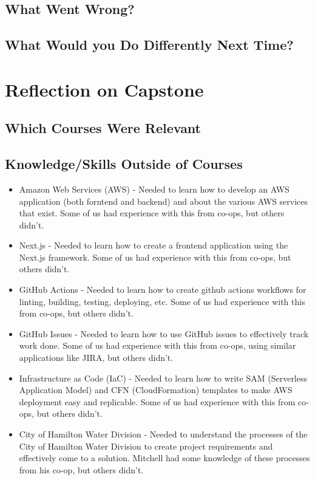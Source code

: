 \documentclass{article}
\begin{document}
\subsection{What Went Wrong?}


\subsection{What Would you Do Differently Next Time?}


\section{Reflection on Capstone}


\subsection{Which Courses Were Relevant}


\subsection{Knowledge/Skills Outside of Courses}
\begin{itemize}
  \item Amazon Web Services (AWS) - Needed to learn how to develop an AWS
    application (both forntend and backend) and about the various AWS
    services that exist. Some of us had experience with this from
    co-ops, but others didn't.
  \item Next.js - Needed to learn how to create a frontend application using
    the Next.js framework. Some of us had experience with this from
    co-ops, but others didn't.
  \item GitHub Actions - Needed to learn how to create github actions
    workflows for linting, building, testing, deploying, etc. Some of
    us had experience with this from co-ops, but others didn't.
  \item GitHub Issues - Needed to learn how to use GitHub issues to
    effectively track work done. Some of us had experience with this
    from co-ops, using similar applications like JIRA, but others didn't.
  \item Infrastructure as Code (IaC) - Needed to learn how to write SAM
    (Serverless Application Model) and CFN (CloudFormation) templates to
    make AWS deployment easy and replicable. Some of us had
    experience with this from co-ops, but others didn't.
  \item City of Hamilton Water Division - Needed to understand the
    processes of the City of Hamilton Water Division to create
    project requirements and effectively come to a solution. Mitchell
    had some knowledge of these processes from his co-op, but others didn't.
\end{itemize}
\end{document}
